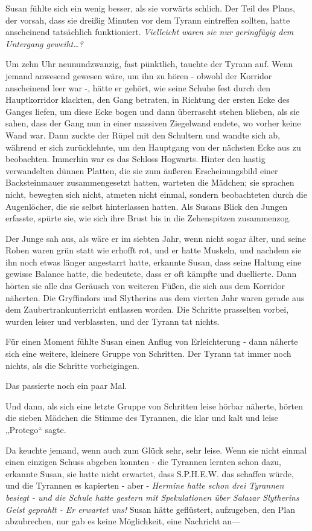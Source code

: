 {Susan fühlte sich ein wenig besser, als sie vorwärts schlich. Der Teil des Plans, der vorsah, dass sie dreißig Minuten vor dem Tyrann eintreffen sollten, hatte anscheinend tatsächlich funktioniert. \emph{Vielleicht waren sie nur geringfügig dem Untergang geweiht…?}

Um zehn Uhr neunundzwanzig, fast pünktlich, tauchte der Tyrann auf. Wenn jemand anwesend gewesen wäre, um ihn zu hören - obwohl der Korridor anscheinend leer war -, hätte er gehört, wie seine Schuhe fest durch den Hauptkorridor klackten, den Gang betraten, in Richtung der ersten Ecke des Ganges liefen, um diese Ecke bogen und dann überrascht stehen blieben, als sie sahen, dass der Gang nun in einer massiven Ziegelwand endete, wo vorher keine Wand war. Dann zuckte der Rüpel mit den Schultern und wandte sich ab, während er sich zurücklehnte, um den Hauptgang von der nächsten Ecke aus zu beobachten. Immerhin war es das Schloss Hogwarts. Hinter den hastig verwandelten dünnen Platten, die sie zum äußeren Erscheinungsbild einer Backsteinmauer zusammengesetzt hatten, warteten die Mädchen; sie sprachen nicht, bewegten sich nicht, atmeten nicht einmal, sondern beobachteten durch die Augenlöcher, die sie selbst hinterlassen hatten. Als Susans Blick den Jungen erfasste, spürte sie, wie sich ihre Brust bis in die Zehenspitzen zusammenzog.

Der Junge sah aus, als wäre er im siebten Jahr, wenn nicht sogar älter, und seine Roben waren grün statt wie erhofft rot, und er hatte Muskeln, und nachdem sie ihn noch etwas länger angestarrt hatte, erkannte Susan, dass seine Haltung eine gewisse Balance hatte, die bedeutete, dass er oft kämpfte und duellierte. Dann hörten sie alle das Geräusch von weiteren Füßen, die sich aus dem Korridor näherten. Die Gryffindors und Slytherins aus dem vierten Jahr waren gerade aus dem Zaubertrankunterricht entlassen worden. Die Schritte prasselten vorbei, wurden leiser und verblassten, und der Tyrann tat nichts.

Für einen Moment fühlte Susan einen Anflug von Erleichterung - dann näherte sich eine weitere, kleinere Gruppe von Schritten. Der Tyrann tat immer noch nichts, als die Schritte vorbeigingen.

Das passierte noch ein paar Mal.

Und dann, als sich eine letzte Gruppe von Schritten leise hörbar näherte, hörten die sieben Mädchen die Stimme des Tyrannen, die klar und kalt und leise „Protego“ sagte.

Da keuchte jemand, wenn auch zum Glück sehr, sehr leise. Wenn sie nicht einmal einen einzigen Schuss abgeben konnten - die Tyrannen lernten schon dazu, erkannte Susan, sie hatte nicht erwartet, dass S.P.H.E.W. das schaffen würde, und die Tyrannen es kapierten - aber - \emph{Hermine hatte schon drei Tyrannen besiegt - und die Schule hatte gestern mit Spekulationen über Salazar Slytherins Geist geprahlt - Er erwartet uns!} Susan hätte geflüstert, aufzugeben, den Plan abzubrechen, nur gab es keine Möglichkeit, eine Nachricht an—

}
